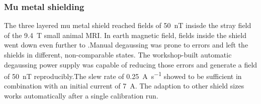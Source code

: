         \subsubsection{Mu metal shielding}
            The three layered mu metal shield reached fields of \SI{50}{\nano\tesla} insisde the stray field of the \SI{9.4}{\tesla} small animal MRI. In earth magnetic field, fields inside the shield went down even further to .Manual degaussing was prone to errors and left the shields in different, non-comparable states. The workshop-built automatic degaussing power supply was capable of reducing those errors and generate a field of \SI{50}{\nano\tesla} reproducibly.The slew rate of \SI{0.25}{\ampere\per\second} showed to be sufficient in combination with an initial current of \SI{7}{\ampere}. The adaption to other shield sizes works automatically after a single calibration run.
